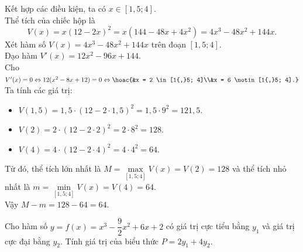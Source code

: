 \begin{ex}
{		Kết hợp các điều kiện, ta có $x \in [1{,}5; 4]$.\\
		Thể tích của chiếc hộp là
		\[V(x) = x(12-2x)^2 = x(144 - 48x + 4x^2) = 4x^3 - 48x^2 + 144x.\]
		Xét hàm số $V(x) = 4x^3 - 48x^2 + 144x$ trên đoạn $[1{,}5; 4]$.\\
		Đạo hàm $V'(x) = 12x^2 - 96x + 144$.\\
		Cho $V'(x) = 0 \Leftrightarrow 12(x^2 - 8x + 12) = 0 \Leftrightarrow \hoac{&x = 2 \in [1{,}5; 4]\\&x = 6 \notin [1{,}5; 4].}$\\
		Ta tính các giá trị:
		\begin{itemize}
			\item $V(1{,}5) = 1{,}5 \cdot (12 - 2 \cdot 1{,}5)^2 = 1{,}5 \cdot 9^2 = 121{,}5$.
			\item $V(2) = 2 \cdot (12 - 2 \cdot 2)^2 = 2 \cdot 8^2 = 128$.
			\item $V(4) = 4 \cdot (12 - 2 \cdot 4)^2 = 4 \cdot 4^2 = 64$.
		\end{itemize}
		Từ đó, thể tích lớn nhất là $M = \max\limits_{[1{,}5; 4]} V(x) = V(2) = 128$ và thể tích nhỏ nhất là $m = \min\limits_{[1{,}5; 4]} V(x) = V(4) = 64$.\\
		Vậy $M - m = 128 - 64 = 64$.
	}
\end{ex}

\begin{ex}%
	Cho hàm số $y = f(x) = x^3 - \dfrac{9}{2}x^2 + 6x + 2$ có giá trị cực tiểu bằng $y_1$ và giá trị cực đại bằng $y_2$. Tính giá trị của biểu thức $P = 2y_1 + 4y_2$.
\end{ex}